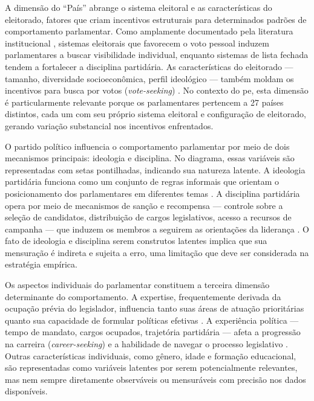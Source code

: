 A dimensão do ``País'' abrange o sistema eleitoral e as características do eleitorado, fatores que criam incentivos estruturais para determinados padrões de comportamento parlamentar. Como amplamente documentado pela literatura institucional \cite{mayhew2004congress, samuels1997determinantes, carey2007competing}, sistemas eleitorais que favorecem o voto pessoal induzem parlamentares a buscar visibilidade individual, enquanto sistemas de lista fechada tendem a fortalecer a disciplina partidária. As características do eleitorado — tamanho, diversidade socioeconômica, perfil ideológico — também moldam os incentivos para busca por votos (\textit{vote-seeking}) \cite{willumsen_electoral_2019}. No contexto do \acrshort{pe}, esta dimensão é particularmente relevante porque os parlamentares pertencem a 27 países distintos, cada um com seu próprio sistema eleitoral e configuração de eleitorado, gerando variação substancial nos incentivos enfrentados.

O partido político influencia o comportamento parlamentar por meio de dois mecanismos principais: ideologia e disciplina. No diagrama, essas variáveis são representadas com setas pontilhadas, indicando sua natureza latente. A ideologia partidária funciona como um conjunto de regras informais que orientam o posicionamento dos parlamentares em diferentes temas \cite{hix2004electoral, helmke2012informal}. A disciplina partidária opera por meio de mecanismos de sanção e recompensa — controle sobre a seleção de candidatos, distribuição de cargos legislativos, acesso a recursos de campanha — que induzem os membros a seguirem as orientações da liderança \cite{carey2007competing, bressanelli2016impact}. O fato de ideologia e disciplina serem construtos latentes implica que sua mensuração é indireta e sujeita a erro, uma limitação que deve ser considerada na estratégia empírica.

Os aspectos individuais do parlamentar constituem a terceira dimensão determinante do comportamento. A expertise, frequentemente derivada da ocupação prévia do legislador, influencia tanto suas áreas de atuação prioritárias quanto sua capacidade de formular políticas efetivas \cite{burden2015personal, damgaard1980dilemma}. A experiência política — tempo de mandato, cargos ocupados, trajetória partidária — afeta a progressão na carreira (\textit{career-seeking}) e a habilidade de navegar o processo legislativo \cite{daniel2015career, chiru2020loyal}. Outras características individuais, como gênero, idade e formação educacional, são representadas como variáveis latentes por serem potencialmente relevantes, mas nem sempre diretamente observáveis ou mensuráveis com precisão nos dados disponíveis.

